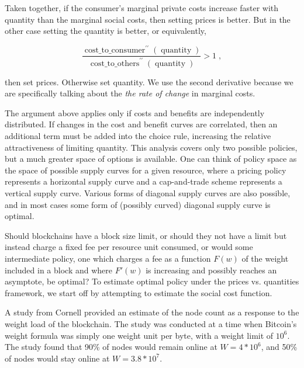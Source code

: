 \documentclass[12pt, final]{article}
\newcommand{\fname}[1]{ \operatorname{ #1 } }
\newcommand{\opname}[1]{ \operatorname{ #1 } }
\begin{document}
Taken together, if the consumer's marginal private costs increase faster with quantity than the marginal social costs, then setting prices is better. But in the other case setting the quantity is better, or equivalently,

\begin{equation}
\frac{ \fname{cost\_to\_consumer}^{\prime \prime}( \opname{quantity} ) }{ \fname{cost\_to\_others}^{\prime \prime}( \opname{quantity}) }  > 1 \; ,
\end{equation}

then set prices.  Otherwise set quantity.  We use the second derivative because we are specifically talking about the \emph{the rate of change} in marginal costs.

The argument above applies only if costs and benefits are independently distributed. If changes in the cost and benefit curves are correlated, then an additional term must be added into the choice rule, increasing the relative attractiveness of limiting quantity.  This analysis covers only two possible policies, but a much greater space of options is available.  One can think of policy space as the space of possible supply curves for a given resource, where a pricing policy represents a horizontal supply curve and a cap-and-trade scheme represents a vertical supply curve. Various forms of diagonal supply curves are also possible, and in most cases some form of (possibly curved) diagonal supply curve is optimal.

Should blockchains have a block size limit, or should they not have a limit but instead charge a fixed fee per resource unit consumed, or would some intermediate policy, one which charges a fee as a function $F(w)$ of the weight included in a block and where $F'(w)$ is increasing and possibly reaches an asymptote, be optimal? To estimate optimal policy under the prices vs. quantities framework, we start off by attempting to estimate the social cost function.

A study from Cornell\cite{cornell} provided an estimate of the node count as a response to the weight load of the blockchain. The study was conducted at a time when Bitcoin's weight formula was simply one weight unit per byte, with a weight limit of $10^6$. The study found that 90\% of nodes would remain online at $W = 4*10^6$, and 50\% of nodes would stay online at $W = 3.8 * 10^7$.
\end{document}
